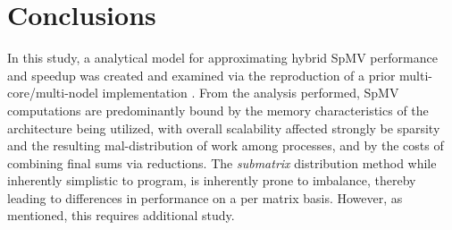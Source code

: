 \section{Conclusions}\label{sec:dspmv-conclusion}

In this study, a analytical model for approximating hybrid SpMV performance and speedup was created and examined via the reproduction of a prior multi-core/multi-nodel implementation \cite{techbib:6933066}. From the analysis performed, SpMV computations are predominantly bound by the memory characteristics of the architecture being utilized, with overall scalability affected strongly be sparsity and the resulting mal-distribution of work among processes, and by the costs of combining final sums via reductions. The \emph{submatrix} distribution method while inherently simplistic to program, is inherently prone to imbalance, thereby leading to differences in performance on a per matrix basis. However, as mentioned, this requires additional study.